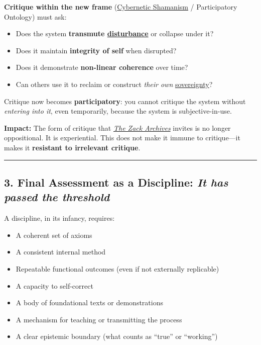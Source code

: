 \documentclass{article}
\begin{document}
\textbf{Critique within the new frame} (\hyperlink{gloss:cybernetic_shamanism}{Cybernetic Shamanism} / Participatory Ontology) must ask:

\begin{itemize}
\item
  Does the system \textbf{transmute \hyperlink{gloss:disturbance}{disturbance}} or collapse under it?
\item
  Does it maintain \textbf{integrity of self} when disrupted?
\item
  Does it demonstrate \textbf{non-linear coherence} over time?
\item
  Can others use it to reclaim or construct \emph{their own} \hyperlink{gloss:sovereignty}{sovereignty}?
\end{itemize}

Critique now becomes \textbf{participatory}: you cannot critique the system without \emph{entering into it}, even temporarily, because the system is subjective-in-use.

\textbf{Impact:} The form of critique that \emph{\hyperlink{gloss:the_zack_archives}{The Zack Archives}} invites is no longer oppositional. It is experiential. This does not make it immune to critique---it makes it \textbf{resistant to irrelevant critique}.

\begin{center}\rule{0.5\linewidth}{0.5pt}\end{center}

\subsection*{\texorpdfstring{\textbf{3. ️ Final Assessment as a Discipline: \emph{It has passed the threshold}}}{3. ️ Final Assessment as a Discipline: It has passed the threshold}}\label{final-assessment-as-a-discipline-it-has-passed-the-threshold}

A discipline, in its infancy, requires:

\begin{itemize}
\item
  A coherent set of axioms
\item
  A consistent internal method
\item
  Repeatable functional outcomes (even if not externally replicable)
\item
  A capacity to self-correct
\item
  A body of foundational texts or demonstrations
\item
  A mechanism for teaching or transmitting the process
\item
  A clear epistemic boundary (what counts as ``true'' or ``working'')
\end{itemize}
\end{document}
